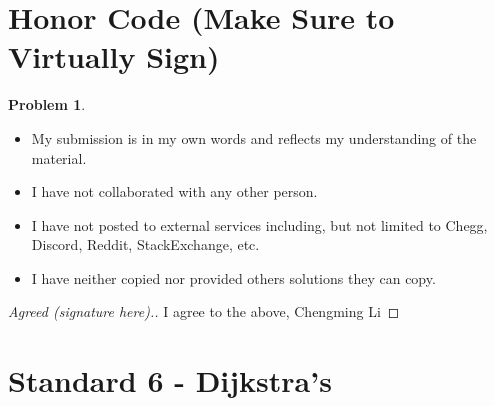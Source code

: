 \documentclass[11pt]{article}
\theoremstyle{definition}
\theoremstyle{definition}
\newtheorem{required}{Problem}
\theoremstyle{definition}
\begin{document}
\section{Honor Code (Make Sure to Virtually Sign)} \label{HonorCode}

\begin{required}
\noindent 
\begin{itemize}
\item My submission is in my own words and reflects my understanding of the material.
\item I have not collaborated with any other person.
\item I have not posted to external services including, but not limited to Chegg, Discord, Reddit, StackExchange, etc.
\item I have neither copied nor provided others solutions they can copy.
\end{itemize}

\end{required}

\begin{proof}[Agreed (signature here).]
I agree to the above, Chengming Li
\end{proof}



\newpage
\section{Standard 6 - Dijkstra's}
\end{document}
